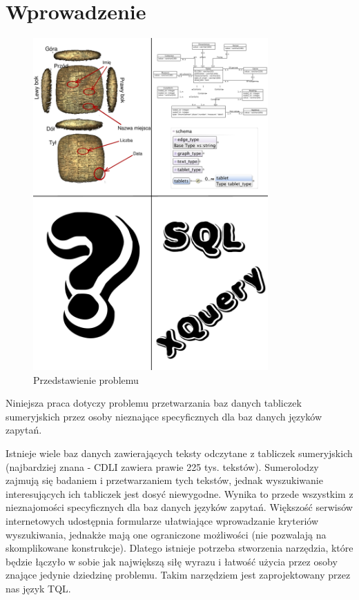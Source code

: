 \chapter*{Wprowadzenie}
\begin{figure}[h]
 \centering
 \includegraphics[width=340px]{../diagramy/poco.pdf}
 \caption{Przedstawienie problemu}
 \label{fig:poco}
\end{figure}

 
 
Niniejsza praca dotyczy problemu przetwarzania baz danych tabliczek sumeryjskich przez osoby nieznające specyficznych dla baz danych języków zapytań.


Istnieje wiele baz danych zawierających teksty odczytane z tabliczek sumeryjskich (najbardziej znana - CDLI zawiera prawie 225 tys. tekstów). Sumerolodzy zajmują się badaniem i przetwarzaniem tych tekstów, jednak wyszukiwanie interesujących ich tabliczek jest dosyć niewygodne. Wynika to przede wszystkim z nieznajomości specyficznych dla baz danych języków zapytań. 
Większość serwisów internetowych udostępnia formularze ułatwiające wprowadzanie kryteriów wyszukiwania, jednakże mają one ograniczone możliwości (nie pozwalają na skomplikowane konstrukcje). Dlatego istnieje potrzeba stworzenia narzędzia, które będzie łączyło w sobie jak największą siłę wyrazu i łatwość użycia przez osoby znające jedynie dziedzinę problemu. Takim narzędziem jest zaprojektowany przez nas język TQL. 

